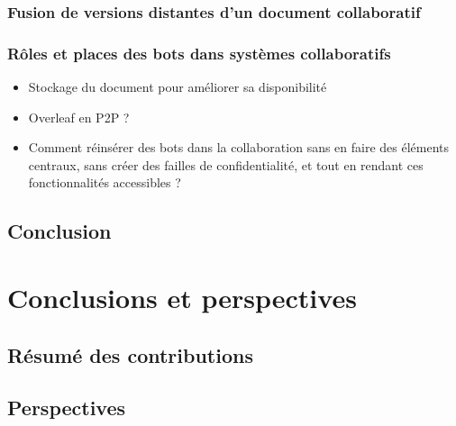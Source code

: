 \documentclass[12pt]{thesul}
\newcommand{\lepoch}{$<_{\varepsilon}$~}
\begin{document}
\subsection{Fusion de versions distantes d'un document collaboratif}

\subsection{Rôles et places des bots dans systèmes collaboratifs}
\begin{itemize}
  \item Stockage du document pour améliorer sa disponibilité
  \item Overleaf en P2P ?
  \item Comment réinsérer des bots dans la collaboration sans en faire des éléments centraux, sans créer des failles de confidentialité, et tout en rendant ces fonctionnalités accessibles ?
\end{itemize}

\section{Conclusion}

\NumberThisInToc
\chapter{Conclusions et perspectives}
\minitoc
\section{Résumé des contributions}
\section{Perspectives}

\end{document}
